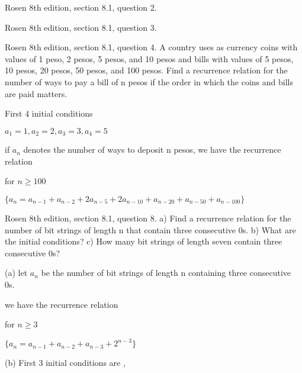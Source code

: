 \newpage
\nextq Rosen 8th edition, section 8.1, question 2.

\SOLUTION



\newpage
\nextq Rosen 8th edition, section 8.1, question 3.

\SOLUTION



\newpage
\nextq Rosen 8th edition, section 8.1, question 4.
A country uses as currency coins with values of 1 peso,
2 pesos, 5 pesos, and 10 pesos and bills with values of
5 pesos, 10 pesos, 20 pesos, 50 pesos, and 100 pesos.
Find a recurrence relation for the number of ways to pay
a bill of n pesos if the order in which the coins and bills
are paid matters.

First 4 initial conditions

$a_1 = 1 , a_2 = 2, a_3 = 3, a_4 =5 $

if $a_n$ denotes the number of ways to deposit n pesos, we have the recurrence relation

for $n \geqslant 100$

$\{a_n = a_{n-1} + a_{n-2} + 2a_{n-5} + 2a_{n-10} 
+ a_{n-20} + a_{n-50} + a_{n-100}\}$

\SOLUTION



\newpage
\nextq Rosen 8th edition, section 8.1, question 8.
a) Find a recurrence relation for the number of bit strings
of length n that contain three consecutive 0s.
b) What are the initial conditions?
c) How many bit strings of length seven contain three
consecutive 0s?

(a) let $a_n$ be the number of bit strings of length n containing three consecutive 0s.

we have the recurrence relation

for $n \geqslant 3$

$\{a_n = a_{n-1} + a_{n-2} + a_{n-3} + 2^{n-3}\}$


(b) First 3 initial conditions are , 


